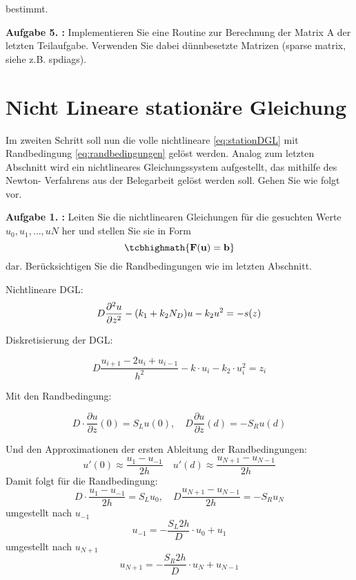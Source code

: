 bestimmt.
\begin{mybox}
	\textbf{Aufgabe 5. :} Implementieren Sie eine Routine zur Berechnung der Matrix A der letzten Teilaufgabe. Verwenden
	Sie dabei dünnbesetzte Matrizen (sparse matrix, siehe z.B. spdiags).
	
\end{mybox}

\section{Nicht Lineare stationäre Gleichung}
\begin{mybox}
	Im zweiten Schritt soll nun die volle nichtlineare \cref{eq:stationDGL} mit Randbedingung \cref{eq:randbedingungen} gelöst werden. Analog
	zum letzten Abschnitt wird ein nichtlineares Gleichungssystem aufgestellt, das mithilfe des Newton-
	Verfahrens aus der Belegarbeit gelöst werden soll. Gehen Sie wie folgt vor.\cite{Prof.Dr.AndreasZeiser.April2021}
\end{mybox}

\begin{mybox}
	\textbf{Aufgabe 1. :} Leiten Sie die nichtlinearen Gleichungen für die gesuchten Werte $u_0,u_1,\dots ,uN$ her und stellen Sie
	sie in Form
	\begin{equation*}
		\tcbhighmath{\mathbf{F}(\mathbf{u})=\mathbf{b}}
	\end{equation*}
dar. Berücksichtigen Sie die Randbedingungen wie im letzten Abschnitt.
\cite{Prof.Dr.AndreasZeiser.April2021}
\end{mybox}
Nichtlineare DGL:
\begin{equation}
	D\pdv[2]{u}{z}-(k_1+k_2N_D)u-k_2u^2=-s(z)
\end{equation}

Diskretisierung der DGL:

\begin{equation}
	D\frac{u_{i+1}-2u_i+u_{i-1}}{h^2}-k\cdot u_i-k_2 \cdot u_i^2=z_i
\end{equation}

Mit den Randbedingung:

\begin{equation}
	D\cdot \frac{\partial u}{\partial z}(0)=S_Lu(0),\quad D\frac{\partial u}{\partial z}(d)=-S_Ru(d)
\end{equation}

Und den Approximationen der ersten Ableitung der  Randbedingungen:
\begin{equation}
	u'(0)\approx \frac{u_1-u_{-1}}{2h} \quad u'(d)\approx \frac{u_{N+1}-u_{N-1}}{2h}
\end{equation}
Damit folgt für die Randbedingung:
\begin{equation}
	D\cdot \frac{u_1-u_{-1}}{2h}=S_Lu_0,\quad D\frac{u_{N+1}-u_{N-1}}{2h}=-S_Ru_N
\end{equation}
umgestellt nach $u_{-1}$
\begin{equation}
	u_{-1}=-\frac{S_L 2h}{D}\cdot u_0+u_1
\end{equation}
umgestellt nach $u_{N+1}$
\begin{equation}
	u_{N+1}=-\frac{S_R2h}{D}\cdot u_N+u_{N-1}
\end{equation}



